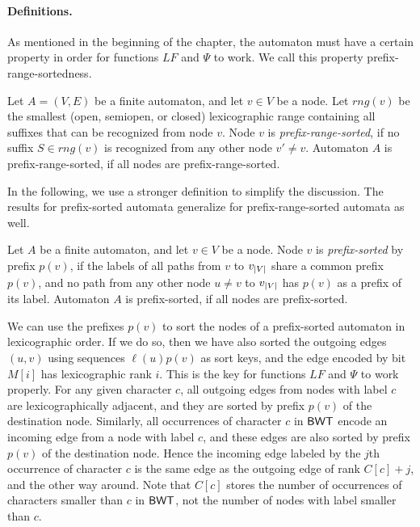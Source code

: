 \paragraph{Definitions.}

As mentioned in the beginning of the chapter, the automaton must have a certain property in order for functions $LF$ and $\Psi$ to work. We call this property prefix-range-sortedness.

\begin{definition}\label{def:prefix-range-sorted}
Let $A = (V, E)$ be a finite automaton, and let $v \in V$ be a node. Let $rng(v)$ be the smallest (open, semiopen, or closed) lexicographic range containing all suffixes that can be recognized from node $v$. Node $v$ is {\em prefix-range-sorted}, if no suffix $S \in rng(v)$ is recognized from any other node $v' \ne v$. Automaton $A$ is prefix-range-sorted, if all nodes are prefix-range-sorted.
\end{definition}

In the following, we use a stronger definition to simplify the discussion. The results for prefix-sorted automata generalize for prefix-range-sorted automata as well.

\begin{definition}\label{def:prefix-sorted}
Let $A$ be a finite automaton, and let $v \in V$ be a node. Node $v$ is {\em prefix-sorted} by prefix $p(v)$, if the labels of all paths from $v$ to $v_{\lvert V \rvert}$ share a common prefix $p(v)$, and no path from any other node $u \ne v$ to $v_{\lvert V \rvert}$ has $p(v)$ as a prefix of its label. Automaton $A$ is prefix-sorted, if all nodes are prefix-sorted.
\end{definition}

We can use the prefixes $p(v)$ to sort the nodes of a prefix-sorted automaton in lexicographic order. If we do so, then we have also sorted the outgoing edges $(u,v)$ using sequences $\ell(u) p(v)$ as sort keys, and the edge encoded by bit $M[i]$ has lexicographic rank $i$. This is the key for functions $LF$ and $\Psi$ to work properly. For any given character $c$, all outgoing edges from nodes with label $c$ are lexicographically adjacent, and they are sorted by prefix $p(v)$ of the destination node. Similarly, all occurrences of character $c$ in $\mathsf{BWT}$ encode an incoming edge from a node with label $c$, and these edges are also sorted by prefix $p(v)$ of the destination node. Hence the incoming edge labeled by the $j$th occurrence of character $c$ is the same edge as the outgoing edge of rank $C[c] + j$, and the other way around. Note that $C[c]$ stores the number of occurrences of characters smaller than $c$ in $\mathsf{BWT}$, not the number of nodes with label smaller than $c$.

